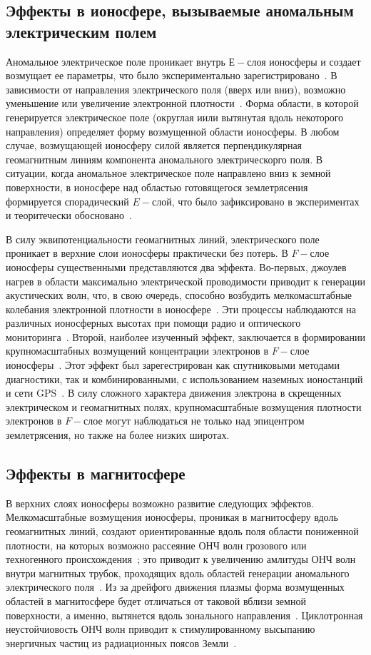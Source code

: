 \documentclass[12pt, oneside, a4paper]{article}
\begin{document}
\subsection{Эффекты в ионосфере, вызываемые аномальным электрическим полем}
Аномальное электрическое поле проникает внутрь $Е-$слоя ионосферы и создает возмущает ее параметры, что было экспериментально зарегистрировано~\cite{Liperovsky:2000}. В зависимости от направления электрического поля (вверх или вниз), возможно уменьшение или увеличение электронной плотности~\cite{Pulinets:1998}. Форма области, в которой генерируется электрическое поле (округлая иили вытянутая вдоль некоторого направления) определяет форму возмущенной области ионосферы. В любом случае,  возмущающей ионосферу силой является перпендикулярная геомагнитным линиям компонента аномального электрическорго поля. В ситуации, когда аномальное электрическое поле направлено вниз к земной поверхности, в ионосфере над областью готовящегося землетрясения формируется спорадический $E-$слой, что было зафиксировано в экспериментах~\cite{Ondoh_Hayakawa:1999} и теоритечески обосновано~\cite{Kim:1994}.

В силу эквипотенциальности геомагнитных линий, электрического поле проникает в верхние слои ионосферы практически без потерь. В $F-$слое ионосферы существенными представляются два эффекта. Во-первых, джоулев нагрев в области максимально электрической проводимости  приводит к генерации акустических волн, что, в свою очередь, способно возбудить мелкомасштабные колебания электронной плотности в ионосфере~\cite{Hegai:1997}. Эти процессы наблюдаются на различных ионосферных высотах при помощи радио и оптического мониторинга~\cite{Chmyrev:1997}. Второй, наиболее изученный эффект, заключается в формировании крупномасштабных возмущений концентрации электронов в $F-$слое ионосферы~\cite{Pulinets_Legenka:2003}. Этот эффект был зарегестрирован как спутниковыми методами диагностики, так и комбинированными, с использованием наземных ионостанций и сети GPS~\cite{Lui:2004}. В силу сложного характера движения электрона в скрещенных электрическом и геомагнитных полях, крупномасштабные возмущения плотности электронов в $F-$слое могут наблюдаться  не только над  эпицентром землетрясения, но также на более низких широтах. 
\subsection{Эффекты в магнитосфере}
В верхних слоях ионосферы возможно развитие следующих эффектов. Мелкомасштабные возмущения ионосферы, проникая в магнитосферу вдоль геомагнитных линий, создают ориентированные вдоль поля области пониженной плотности, на которых возможно рассеяние ОНЧ волн грозового или техногенного происхождения~\cite{Kim_Hegai:1997}; это приводит к увеличению амлитуды ОНЧ волн внутри магнитных трубок, проходящих вдоль областей генерации аномального электрического поля~\cite{Shklyar_Nagano:1998}. Из за дрейфого движения плазмы форма возмущенных областей в магнитосфере будет отличаться от таковой вблизи земной поверхности, а именно, вытянется вдоль зонального направления~\cite{Kim_Hegai:1997}. Циклотронная неустойчиовость ОНЧ волн приводит к стимулированному высыпанию  энергичных частиц из радиационных поясов Земли~\cite{Galper:1995}.
\end{document}
